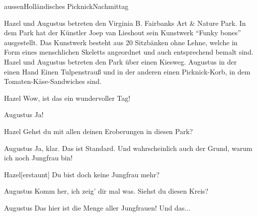 \documentclass[12pt]{article}
\begin{document}
    \begin{scene}{aussen}{Holländisches Picknick}{Nachmittag}
        \begin{scenedescription}
            \gls{Hazel} und \gls{Augustus} betreten den Virginia B. Fairbanks Art \& Nature Park.
            In dem Park hat der Künstler Joep van Lieshout sein Kunstwerk ``Funky bones'' ausgestellt.
            Das Kunstwerk besteht aus 20 Sitzbänken ohne Lehne, welche in Form eines menschlichen Skeletts angeordnet und auch entsprechend bemalt sind.
            \gls{Hazel} und \gls{Augustus} betreten den Park über einen Kiesweg.
            \gls{Augustus} in der einen Hand Einen Tulpenstrauß und in der anderen einen Picknick-Korb, in dem Tomaten-Käse-Sandwiches sind.
        \end{scenedescription}

        \begin{dialog}{Hazel}
            Wow, ist das ein wundervoller Tag!
        \end{dialog}

        \begin{dialog}{Augustus}
            Ja!
        \end{dialog}

        \begin{dialog}{Hazel}
            Gehst du mit allen deinen Eroberungen in diesen Park?
        \end{dialog}

        \begin{dialog}{Augustus}
            Ja, klar.
            Das ist Standard.
            Und wahrscheinlich auch der Grund, warum ich noch Jungfrau bin!
        \end{dialog}

        \begin{dialog}{Hazel}[erstaunt]
            Du bist doch keine Jungfrau mehr?
        \end{dialog}

        \begin{dialog}{Augustus}
            Komm her, ich zeig' dir mal was.
            Siehst du diesen Kreis?
        \end{dialog}


        \begin{dialog}{Augustus}
            Das hier ist die Menge aller Jungfrauen!
            Und das...
        \end{dialog}


\end{scene}
\end{document}
